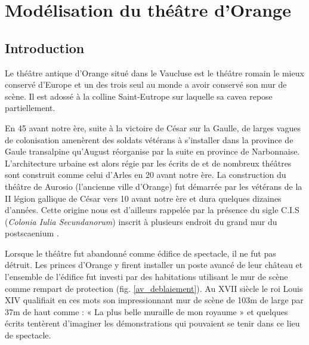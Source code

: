 \part{Modélisation du théâtre d’Orange}

	\chapter*{Introduction}
	 
			 Le théâtre antique d'Orange situé dans le Vaucluse est le théâtre romain le mieux conservé d'Europe et un des trois seul au monde a avoir conservé son mur de scène. Il est adossé à la colline Saint-Eutrope sur laquelle sa \gls{cavea} repose partiellement.
			 
			 En 45 avant notre ère, suite à la victoire de César sur la Gaulle, de larges vagues de colonisation amenèrent des soldats vétérans à s'installer dans la province de Gaule transalpine qu'August réorganise par la suite en province de Narbonnaise. L'architecture urbaine est alors régie par les écrits de \cite{vitruve} et de nombreux théâtres sont construit comme celui d'Arles en 20 avant notre ère. La construction du théâtre de Aurosio (l'ancienne ville d'Orange) fut démarrée par les vétérans de la II légion gallique de César vers 10 avant notre ère et dura quelques dizaines d'années. \citep{PouvoirDuTheatre} Cette origine nous est d'ailleurs rappelée par la présence du sigle C.I.S (\textit{Colonia Iulia Secundanorum}) inscrit à plusieurs endroit du grand mur du \gls{postscaenium} \cite{formige}. 
			 
			 Lorsque le théâtre fut abandonné comme édifice de spectacle, il ne fut pas détruit. Les princes d'Orange y firent installer un poste avancé de leur château et l’ensemble de l’édifice fut investi par des habitations utilisant le mur de scène comme rempart de protection (fig. \ref{av_deblaiement}). Au XVII siècle le roi Louis XIV qualifiait en ces mots son impressionnant mur de scène de 103m de large par 37m de haut comme : « La plus belle muraille de mon royaume » et quelques écrits tentèrent d'imaginer les démonstrations qui pouvaient se tenir dans ce lieu de spectacle. 
			 
